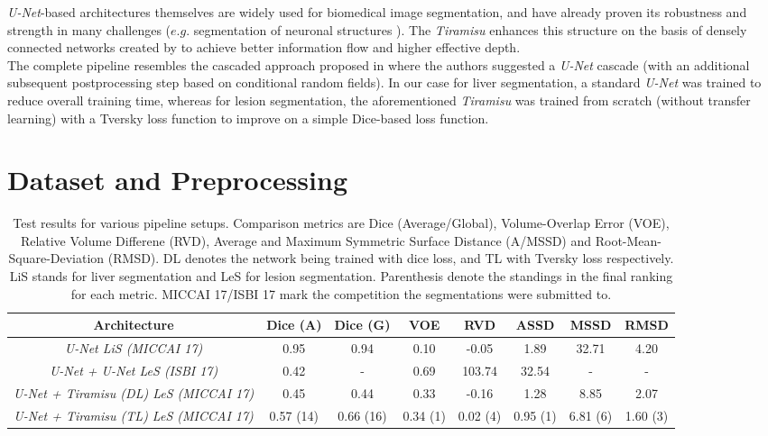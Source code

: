 \documentclass{article}
\begin{document}
\textit{U-Net}-based architectures themselves are widely used for biomedical image segmentation, and have already proven its robustness and strength in many challenges ($e.g.$ segmentation of neuronal structures \cite{NEURO}). The \textit{Tiramisu} \cite{tiramisu} enhances this structure on the basis of densely connected networks created by \cite{densenet} to achieve better information flow and higher effective depth. \\
The complete pipeline resembles the cascaded approach proposed in \cite{LITS} where the authors suggested a \textit{U-Net} cascade (with an additional subsequent postprocessing step based on conditional random fields). In our case for liver segmentation, a standard \textit{U-Net} was trained to reduce overall training time, whereas for lesion segmentation, the aforementioned \textit{Tiramisu} was trained from scratch (without transfer learning) with a Tversky loss function to improve on a simple Dice-based loss function.

\section{Dataset and Preprocessing}
\label{sec:prepro}


\begin{table*}[h]
\centering
\begin{tabular}{c|c|c|c|c|c|c|c}

\textbf{Architecture} & \textbf{Dice (A)} & \textbf{Dice (G)} & \textbf{VOE} & \textbf{RVD} & \textbf{ASSD} & \textbf{MSSD} & \textbf{RMSD}\\
\hline
\textit{U-Net LiS (MICCAI 17)}& 0.95 & 0.94 & 0.10 & -0.05 & 1.89 & 32.71 & 4.20\\
\hline
\textit{U-Net + U-Net LeS (ISBI 17)}& 0.42 & - & 0.69 & 103.74 & 32.54 & - & -\\
\textit{U-Net + Tiramisu (DL) LeS (MICCAI 17)} & 0.45 & 0.44 & 0.33 & -0.16 & 1.28 & 8.85 & 2.07\\
\textit{U-Net + Tiramisu (TL) LeS (MICCAI 17)} & 0.57 (14)& 0.66 (16)& 0.34 (1)& 0.02 (4)& 0.95 (1)& 6.81 (6)& 1.60 (3)\\
\hline
\end{tabular}
\caption{Test results for various pipeline setups. Comparison metrics are Dice (Average/Global), Volume-Overlap Error (VOE), Relative Volume Differene (RVD), Average and Maximum Symmetric Surface Distance (A/MSSD) and Root-Mean-Square-Deviation (RMSD). DL denotes the network being trained with dice loss, and TL with Tversky loss respectively. LiS stands for liver segmentation and LeS for lesion segmentation. Parenthesis denote the standings in the final ranking for each metric. MICCAI 17/ISBI 17 mark the competition the segmentations were submitted to. }
\label{tab:res}
\end{table*}
\end{document}
